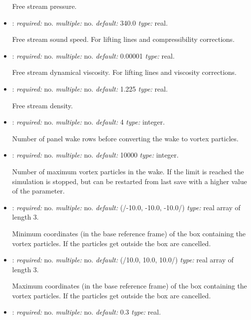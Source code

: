 \begin{itemize}
Free stream pressure.

\item {}: \textit{required:} no. \textit{multiple:} no. 
\textit{default:} 340.0 \textit{type:} real.

Free stream sound speed. For lifting lines and compressibility corrections.


\item {}: \textit{required:} no. \textit{multiple:} no. 
\textit{default:} 0.00001 \textit{type:} real.

Free stream dynamical viscosity. For lifting lines and viscosity corrections.

\item {}: \textit{required:} no. \textit{multiple:} no. 
\textit{default:} 1.225 \textit{type:} real.

Free stream density.

\item {}: \textit{required:} no. \textit{multiple:} no. 
\textit{default:} 4 \textit{type:} integer.

Number of panel wake rows before converting the wake to vortex particles.


\item {}: \textit{required:} no. \textit{multiple:} no. 
\textit{default:} 10000 \textit{type:} integer.

Number of maximum vortex particles in the wake. If the limit is reached the simulation is stopped, but can be restarted from last save with a higher value of the parameter. 


\item {}: \textit{required:} no. \textit{multiple:} no. 
\textit{default:} (/-10.0, -10.0, -10.0/) \textit{type:} real array of length 3.

Minimum coordinates (in the base reference frame) of the box containing the vortex 
particles. If the particles get outside the box are cancelled.

\item {}: \textit{required:} no. \textit{multiple:} no. 
\textit{default:} (/10.0, 10.0, 10.0/) \textit{type:} real array of length 3.

Maximum coordinates (in the base reference frame) of the box containing the vortex 
particles. If the particles get outside the box are cancelled.

\item {}: \textit{required:} no. \textit{multiple:} no. 
\textit{default:} 0.3 \textit{type:} real.


\end{itemize}
